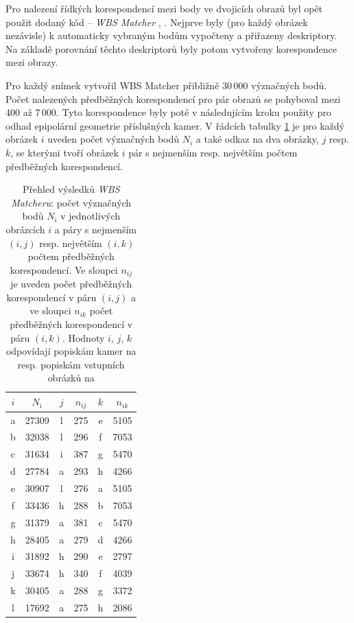 \documentclass[11pt,oneside,a4paper,pdftex]{article}   %
\begin{document}
		Pro nalezení řídkých korespondencí mezi body ve dvojicích obrazů byl opět použit dodaný kód --
		\emph{WBS Matcher} \cite{code_repo}, \cite{WBS_Matcher}.  Nejprve byly (pro každý obrázek
		nezávisle) k automaticky vybraným  bodům vypočteny a přiřazeny deskriptory. Na
		základě porovnání těchto deskriptorů byly potom vytvořeny korespondence mezi obrazy.
		
		Pro každý snímek vytvořil WBS Matcher přibližně 30\,000 význačných bodů. Počet na\-le\-ze\-ných
		před\-běž\-ných ko\-res\-pon\-den\-cí pro pár obrazů se pohyboval mezi 400 až 7\,000. Tyto korespondence byly
		poté v následujícím kroku použity pro odhad epipolární geometrie pří\-slu\-šných kamer.  V
		řádcích tabulky \ref{tabWbsFeatures} je pro každý obrázek $i$ uveden počet význačných bodů $N_i$
		a také odkaz na dva obrázky, $j$ resp. $k$, se kterými tvoří obrázek $i$ pár s nejmenším resp.
		největším počtem předběžných korespondencí.
		
			\begin{table}[h]
				\centering
				\begin{tabular}{|c|c|cccc|}
					\hline
					$i$ & $N_i$ & $j$ & $n_{ij}$ & $k$ & $n_{ik}$ \\
					\hline
					a & 27309 & l & 275 & e & 5105 \\
					b & 32038 & l & 296 & f & 7053 \\
					c & 31634 & i & 387 & g & 5470 \\
					d & 27784 & a & 293 & h & 4266 \\
					e & 30907 & l & 276 & a & 5105 \\
					f & 33436 & h & 288 & b & 7053 \\
					g & 31379 & a & 381 & c & 5470 \\
					h & 28405 & a & 279 & d & 4266 \\
					i & 31892 & h & 290 & e & 2797 \\
					j & 33674 & h & 340 & f & 4039 \\
					k & 30405 & a & 288 & g & 3372 \\
					l & 17692 & a & 275 & h & 2086 \\
					\hline
				\end{tabular}
				\caption{Přehled výsledků \emph{WBS Matcheru}: počet význačných bodů $N_i$ v jednotlivých
					obrázcích $i$ a páry s nejmenším $(i,j)$ resp. největším $(i,k)$ počtem předběžných
					korespondencí. Ve sloupci $n_{ij}$ je uveden počet předběžných korespondencí v páru
					$(i,j)$ a ve sloupci $n_{ik}$ počet předběžných korespondencí v páru $(i,k)$.
					Hodnoty $i$, $j$, $k$ odpovídají popiskám kamer na  resp.
					popiskám vstupních obrázků na }
				\label{tabWbsFeatures}
			\end{table}
	
\end{document}

